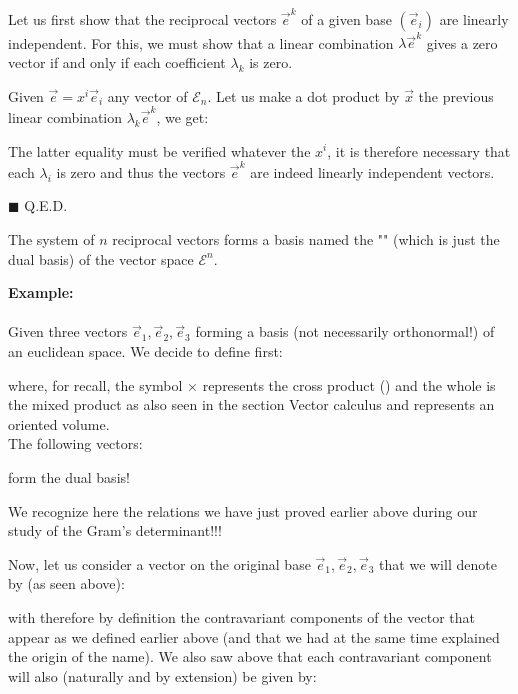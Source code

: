	Let us first show that the reciprocal vectors $\vec{e}^k$ of a given base $(\vec{e}_i)$ are linearly independent. For this, we must show that a linear combination $\lambda\vec{e}^k$ gives a zero vector if and only if each coefficient $\lambda_k$ is zero.
	\begin{dem}
	Given $\vec{e}=x^i\vec{e}_i$ any vector of $\mathcal{E}_n$. Let us make a dot product by $\vec{x}$ the previous linear combination $\lambda_k \vec{e}^k$, we get:
	
	The latter equality must be verified whatever the $x^i$, it is therefore necessary that each $\lambda_i$ is zero and thus the vectors $\vec{e}^k$ are indeed linearly independent vectors.
	\begin{flushright}
		$\blacksquare$  Q.E.D.
	\end{flushright}
	\end{dem} 
	The system of $n$ reciprocal vectors forms a basis named the "" (which is just the dual basis) of the vector space $\mathcal{E}^n$.
	\begin{tcolorbox}[colframe=black,colback=white,sharp corners]
	\textbf{{\Large {}}Example:}\\\\
	Given three vectors $\vec{e}_1,\vec{e}_2,\vec{e}_3$ forming a basis (not necessarily orthonormal!) of an euclidean space. We decide to define first:
	
	where, for recall, the symbol $\times$ represents the cross product () and the whole is the  mixed product as also seen in the section Vector calculus and represents an oriented volume.\\
	
	The following vectors:
	
	form the dual basis!\\
	\begin{tcolorbox}[title=Remark,colframe=black,arc=10pt]
	We recognize here the relations we have just proved earlier above during our study of the Gram's determinant!!!
	\end{tcolorbox}
	\end{tcolorbox}
	Now, let us consider a vector on the original base $\vec{e}_1,\vec{e}_2,\vec{e}_3$ that we will denote by (as seen above):
	
	with therefore by definition the contravariant components of the vector that appear as we defined earlier above (and that we had at the same time explained the origin of the name). We also saw above that each contravariant component will also (naturally and by extension) be given by:
	
